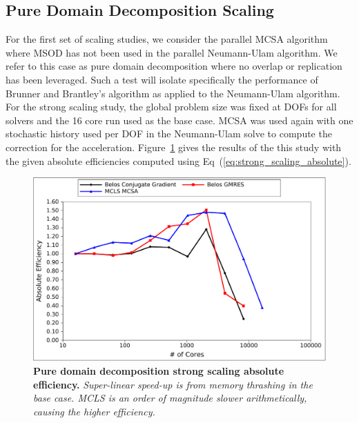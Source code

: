 \clearpage

\subsection{Pure Domain Decomposition Scaling}
\label{subsec:pure_domain_decomp}

For the first set of scaling studies, we consider the parallel MCSA
algorithm where MSOD has not been used in the parallel Neumann-Ulam
algorithm. We refer to this case as pure domain decomposition where no
overlap or replication has been leveraged. Such a test will isolate
specifically the performance of Brunner and Brantley's algorithm as
applied to the Neumann-Ulam algorithm. For the strong scaling study,
the global problem size was fixed at  DOFs for all solvers
and the 16 core run used as the base case. MCSA was used again with
one stochastic history used per DOF in the Neumann-Ulam solve to
compute the correction for the
acceleration. Figure~\ref{fig:titan_pure_strong} gives the results of
the this study with the given absolute efficiencies computed using
Eq~(\ref{eq:strong_scaling_absolute}).

\begin{figure}[t!]
  \begin{center}
    \includegraphics[width=6in]{chapters/parallel_mc/titan_pure_strong.pdf}
  \end{center}
  \caption{\textbf{Pure domain decomposition strong scaling absolute
      efficiency.}  \textit{Super-linear speed-up is from memory
      thrashing in the base case. MCLS is an order of magnitude slower
      arithmetically, causing the higher efficiency.}}
  \label{fig:titan_pure_strong}
\end{figure}

